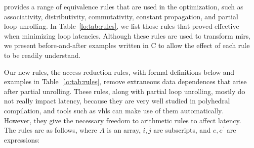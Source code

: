 \soap{} provides a range of equivalence rules that are used in the
optimization, such as associativity, distributivity, commutativity, constant
propagation, and partial loop unrolling.  In Table~\ref{lo:tab:rules}, we list
those rules that proved effective when minimizing loop latencies.  Although
these rules are used to transform \glspl{mir}, we present before-and-after
examples written in C to allow the effect of each rule to be readily
understand.

Our new rules, the access reduction rules, with formal definitions below and
examples in Table~\ref{lo:tab:rules}, remove extraneous data dependences that
arise after partial unrolling.  These rules, along with partial loop unrolling,
mostly do not really impact latency, because they are very well studied in
polyhedral compilation, and tools such as \gls{vhls} can make use of them
automatically.  However, they give the necessary freedom to arithmetic rules
to affect latency.  The rules are as follows, where $A$ is an array, $\bar{i},
\bar{j}$ are subscripts, and $e, e^\prime$ are expressions:
